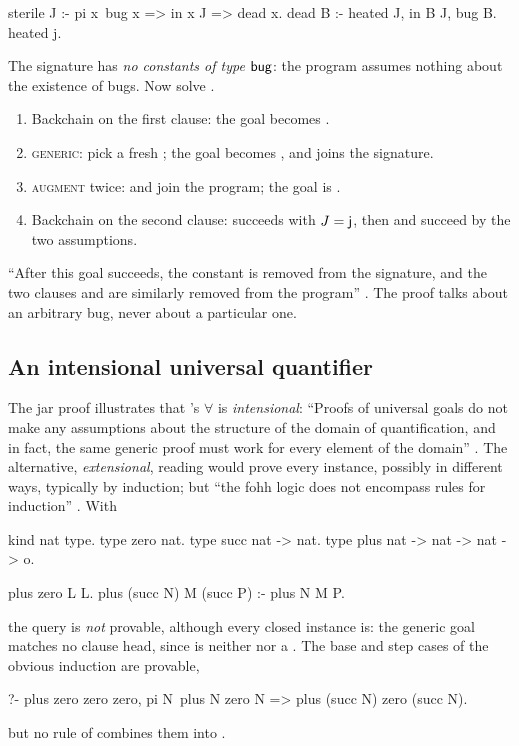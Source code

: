 {\begin{tutorial}
\begin{lprolog}
sterile J :- pi x\ bug x => in x J => dead x.
dead B    :- heated J, in B J, bug B.
heated j.
\end{lprolog}
The signature has \emph{no constants of type $\mathsf{bug}$}: the program assumes nothing about the existence
of bugs. Now solve .
\begin{enumerate}
  \item Backchain on the first clause: the goal becomes .
  \item \textsc{generic}: pick a fresh ; the goal becomes , and
         joins the signature.
  \item \textsc{augment} twice:  and  join the program; the goal is .
  \item Backchain on the second clause:  succeeds with $J=\mathsf{j}$, then  and
         succeed by the two assumptions.
\end{enumerate}
``After this goal succeeds, the constant  is removed from the signature, and the two clauses
 and  are similarly removed from the program'' . The proof talks about
an arbitrary bug, never about a particular one.
\end{tutorial}

\subsection{An intensional universal quantifier}

The jar proof illustrates that \fohh's $\forall$ is \emph{intensional}: ``Proofs of universal goals do not
make any assumptions about the structure of the domain of quantification, and in fact, the same generic
proof must work for every element of the domain'' . The alternative, \emph{extensional}, reading
would prove every instance, possibly in different ways, typically by induction; but ``the fohh logic does
not encompass rules for induction'' . With
\begin{lprolog}
kind nat   type.
type zero  nat.
type succ  nat -> nat.
type plus  nat -> nat -> nat -> o.

plus zero L L.
plus (succ N) M (succ P) :- plus N M P.
\end{lprolog}
the query  is \emph{not} provable, although every closed instance is: the
generic goal  matches no clause head, since  is neither  nor a
. The base and step cases of the obvious induction are provable,
\begin{lprolog}
?- plus zero zero zero,
   pi N\ plus N zero N =>
         plus (succ N) zero (succ N).
\end{lprolog}
but no rule of \fohh{} combines them into  .

}

